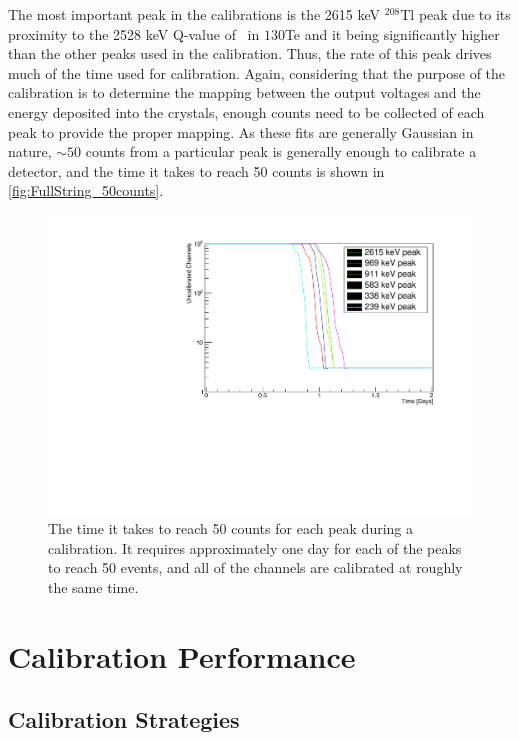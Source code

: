 The most important peak in the calibrations is the 2615 keV $^{208}$Tl peak due to its proximity to the 2528 keV Q-value of \zeronubb~in ${130}$Te and it being significantly higher than the other peaks used in the calibration.
Thus, the rate of this peak drives much of the time used for calibration.
Again, considering that the purpose of the calibration is to determine the mapping between the output voltages and the energy deposited into the crystals, enough counts need to be collected of each peak to provide the proper mapping.
As these fits are generally Gaussian in nature, $\sim50$ counts from a particular peak is generally enough to calibrate a detector, and the time it takes to reach 50 counts is shown in \autoref{fig:FullString_50counts}.
\begin{figure}
    \centering
    \includegraphics[width=0.9\linewidth]{Figures/FullString_50Counts.pdf}
    \caption[The time it takes to reach 50 counts for each peak during a calibration.]{The time it takes to reach 50 counts for each peak during a calibration.
    It requires approximately one day for each of the peaks to reach 50 events, and all of the channels are calibrated at roughly the same time.}
    \label{fig:FullString_50counts}
\end{figure}

\section{Calibration Performance}

\subsection*{Calibration Strategies}
\label{ssec:Calibration Strategies}

